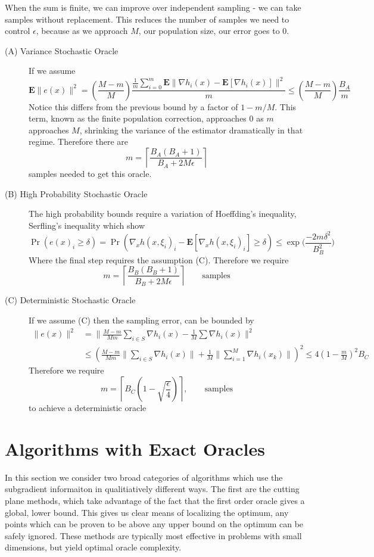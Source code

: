 When the sum is finite, we can improve over independent sampling - we can take
samples without replacement. This reduces the number of samples we need to 
control $\epsilon$, because as we approach $M$, our population size, our error
goes to $0$.
\begin{description}
\item[(A) Variance Stochastic Oracle] If we assume  $$
\mathbf{E}\|e(x)\|^{2} = 
\left(\frac{M-m}{M}\right)\frac{\frac{1}{m}
\sum_{i=0}^{m}\mathbf{E}\|\nabla h_i(x)-\mathbf{E}[\nabla h_i(x)]\|^{2}}{m} 
\leq\left(\frac{M-m}{M}\right)\frac{B_A}{m} $$ Notice this
differs from the previous bound by a factor of $1 - m/M$. This term, known as
the finite population correction, approaches $0$ as $m$ approaches $M$, shrinking
the variance of the estimator dramatically in that regime. Therefore 
there are 
$$m= \left\lceil \frac{B_A(B_A+1)}{B_A+2M\epsilon} \right\rceil $$
samples needed to get this oracle.
\item[(B) High Probability Stochastic Oracle] The high probability bounds require
a variation of Hoeffding's inequality, Serfling's inequality which show
$$
\Pr\left(e(x)_i \geq\delta\right)=\Pr\left(\nabla_x h(x,\xi_{i})_i-\mathbf{E}[\nabla_x h(x,\xi_{i})_i] \geq\delta\right)\leq\exp\Big(\frac{-2m\delta^{2}}{B_B^{2}}\Big)
$$
Where the final step requires the assumption (C). Therefore we require
$$m=  \left\lceil \frac{B_B(B_B+1)}{B_B+2M\epsilon}  \right\rceil \qquad \mbox{samples}$$

\item[(C) Deterministic Stochastic Oracle] If we assume (C) then the
sampling error, can be bounded by
\begin{align*}
\|e(x)\|^{2} & =\Big\|\frac{M-m}{Mm}\sum_{i\in S}\nabla h_{i}(x)-\frac{1}{M}\sum\nabla h_{i}(x)\Big\|^{2}\\
 & \leq\left(\frac{M-m}{Mm}\Big\|\sum_{i\in S}\nabla h_{i}(x)\Big\|+\frac{1}{M}\Big\|\sum_{i=1}^{M}\nabla h_{i}(x_{k})\Big\|\right)^{2}\leq4\left(1-\frac{m}{M}\right)^{2}B_C
\end{align*}
Therefore we require
$$
m=\left\lceil B_C\left(1-\sqrt{\frac{\epsilon}{4}}\right)\right\rceil, \qquad \mbox{samples}
$$
to achieve a deterministic oracle
\end{description}


\section{Algorithms with Exact Oracles}

In this section we consider two broad categories of algorithms which use the
subgradient informaiton in qualitiatively different ways. The first are the
cutting plane methods, which take advantage of the fact that the first order
oracle gives a global, lower bound. This gives us clear means of localizing
the optimum, any points which can be proven to be above any upper bound on the
optimum can be safely ignored.  These methods are typically most effective in
problems with small dimensions,  but yield optimal oracle complexity.

